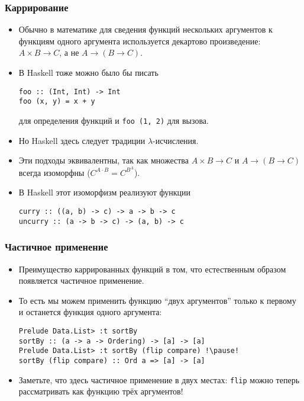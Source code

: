 \documentclass[10pt]{beamer}
\begin{document}
\begin{frame}[fragile]
\frametitle{Каррирование}
\begin{itemize}
    \item Обычно в математике для сведения функций нескольких аргументов к функциям одного аргумента используется декартово произведение: $A \times B \to C$, а не $A \to (B \to C)$.\pause
    \item В Haskell тоже можно было бы писать
\begin{lstlisting}
foo :: (Int, Int) -> Int
foo (x, y) = x + y
\end{lstlisting}
для определения функций и \lstinline|foo (1, 2)| для вызова.\pause
    \item Но Haskell здесь следует традиции $\lambda$-исчисления.\pause
    \item Эти подходы эквивалентны, так как множества $A \times B \to C$ и $A \to (B \to C)$ всегда изоморфны \pause ($C^{A \cdot B} = C^{B^A}$).
    \item В Haskell этот изоморфизм реализуют функции\pause
\begin{lstlisting}
curry :: ((a, b) -> c) -> a -> b -> c
uncurry :: (a -> b -> c) -> (a, b) -> c
\end{lstlisting}
\end{itemize}
\end{frame}

\begin{frame}[fragile]
\frametitle{Частичное применение}
\begin{itemize}
    \item Преимущество каррированных функций в том, что естественным образом появляется частичное применение.
    \item То есть мы можем применить функцию \enquote{двух аргументов} только к первому и останется функция одного аргумента:
\begin{lstlisting}
Prelude Data.List> :t sortBy
sortBy :: (a -> a -> Ordering) -> [a] -> [a]
Prelude Data.List> :t sortBy (flip compare) !\pause!
sortBy (flip compare) :: Ord a => [a] -> [a]
\end{lstlisting}\pause
    \item Заметьте, что здесь частичное применение в двух местах: \pause\lstinline|flip| можно теперь рассматривать как функцию трёх аргументов!
\end{itemize}
\end{frame}
\end{document}
